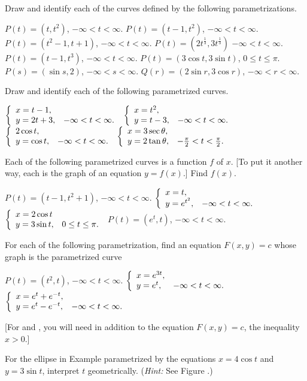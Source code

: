 \begin{exercises}

Draw and identify each of the curves
defined by the following parametrizations.
\begin{exenum}
\x
$P(t) = (t, t^2)$, \quad $-\infty < t < \infty$.
\x
$P(t) = (t-1, t^2)$, \quad $-\infty < t < \infty$.
\x
$P(t) = (t^2-1, t+1)$, \quad $-\infty < t < \infty$.
\x
$P(t) = (2t^{\frac13}, 3t^{\frac13})$
\quad $-\infty < t < \infty$.
\x
$P(t) = (t-1, t^3)$, \quad $-\infty < t < \infty$.
\x
$P(t) = (3\cos t, 3\sin t)$, \quad $0 \leq t \leq \pi$.
\x
$P(s) = (\sin s, 2)$, \quad $-\infty < s < \infty$.
\x
$Q(r) = (2\sin r, 3\cos r)$, \quad $-\infty < r < \infty$.
\end{exenum}

Draw and identify each of the following
parametrized curves.
\begin{exenum}
\x
$\left\{ \begin{array}{ll} x=t-1, \\ y=2t+3, & -\infty < t < \infty. \end{array} \right.$
\x
$\left\{ \begin{array}{ll} x=t^2, \\ y=t-3, & -\infty < t < \infty. \end{array} \right.$
\x
$\left\{ \begin{array}{ll} 2 \cos t, \\ y=\cos t, & -\infty < t < \infty. \end{array} \right.$
\x
$\left\{ \begin{array}{ll} x=3\sec\theta, \\ y=2\tan\theta, & -\frac{\pi}2 < t < \frac{\pi}2. \end{array} \right.$
\end{exenum}

Each of the following parametrized curves
is a function $f$ of $x$.
[To put it another way, each is the graph
of an equation $y = f(x)$.]
Find $f(x)$.
\begin{exenum}
\x
$P(t) = (t-1, t^2+1)$, \quad $-\infty < t < \infty$.
\x
$\left\{ \begin{array}{ll} x=t, \\ y=e^{t^2}, & -\infty < t < \infty. \end{array} \right.$
\x
$\left\{ \begin{array}{ll} x=2\cos t \\ y=3\sin t, & 0 \leq t \leq \pi. \end{array} \right.$
\x
$P(t) = (e^t, t)$, \quad $-\infty < t < \infty$.
\end{exenum}

For each of the following parametrization,
find an equation $F(x,y) = c$ whose
graph is the parametrized curve
\begin{exenum}
\x
$P(t) = (t^2,t)$, \quad $-\infty < t < \infty$.
\x
{}
$\left\{ \begin{array}{ll} x=e^{3t}, \\ y=e^t, & -\infty < t < \infty. \end{array} \right.$
\x
{}
$\left\{ \begin{array}{ll} x=e^t+e^{-t}, \\ y=e^t-e^{-t}, & -\infty < t < \infty. \end{array} \right.$
\end{exenum}
[For  and , you
will need in addition to the equation
$F(x,y) = c$, the inequality $x>0$.]

For the ellipse in Example 
parametrized by the equations $x=4 \cos t$
and $y=3 \sin t$, interpret $t$ geometrically.
(\emph{Hint:} See Figure .)


\end{exercises}
